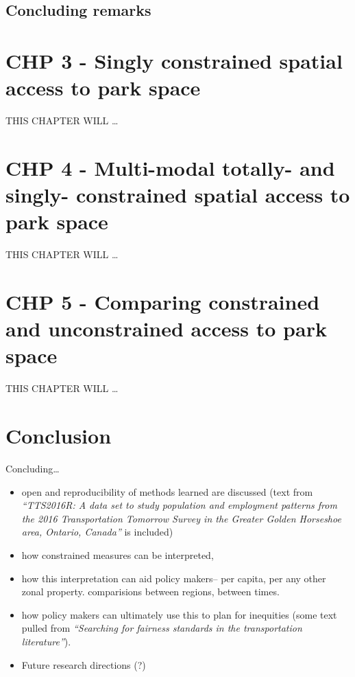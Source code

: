 \documentclass[
11pt, %
oneside, %
english, %
singlespacing, %
]{macthesis} %
\def\tightlist{}
\begin{document}
\section{Concluding remarks}\label{concluding-remarks}

\chapter{CHP 3 - Singly constrained spatial access to park space}\label{chp-3---singly-constrained-spatial-access-to-park-space}

THIS CHAPTER WILL \ldots{}

\chapter{CHP 4 - Multi-modal totally- and singly- constrained spatial access to park space}\label{chp-4---multi-modal-totally--and-singly--constrained-spatial-access-to-park-space}

THIS CHAPTER WILL \ldots{}

\chapter{CHP 5 - Comparing constrained and unconstrained access to park space}\label{chp-5---comparing-constrained-and-unconstrained-access-to-park-space}

THIS CHAPTER WILL \ldots{}

\chapter*{Conclusion}\label{conclusion}

Concluding\ldots{}

\begin{itemize}
\tightlist
\item
  open and reproducibility of methods learned are discussed (text from \emph{``TTS2016R: A data set to study population and employment patterns from the 2016 Transportation Tomorrow Survey in the Greater Golden Horseshoe area, Ontario, Canada''} is included)
\item
  how constrained measures can be interpreted,
\item
  how this interpretation can aid policy makers-- per capita, per any other zonal property. comparisions between regions, between times.
\item
  how policy makers can ultimately use this to plan for inequities (some text pulled from \emph{``Searching for fairness standards in the transportation literature''}).
\item
  Future research directions (?)
\end{itemize}
\end{document}

